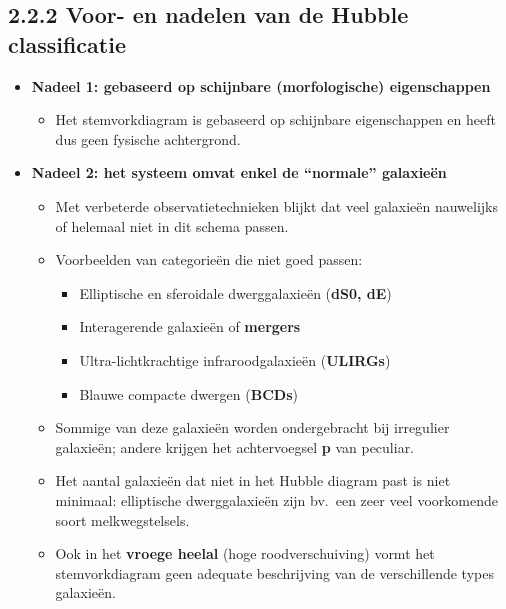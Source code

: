 \documentclass[10pt,a4paper]{article}
\begin{document}
\subsection*{2.2.2 Voor- en nadelen van de Hubble classificatie}
\begin{itemize}
  
  \item \textbf{Nadeel 1: gebaseerd op schijnbare (morfologische) eigenschappen}
  \begin{itemize}
    \item Het stemvorkdiagram is gebaseerd op schijnbare eigenschappen en heeft dus geen fysische achtergrond.
  \end{itemize}

  \item \textbf{Nadeel 2: het systeem omvat enkel de ``normale'' galaxieën}
  \begin{itemize}
    \item Met verbeterde observatietechnieken blijkt dat veel galaxieën nauwelijks of helemaal niet in dit schema passen.
    \item Voorbeelden van categorieën die niet goed passen:
    \begin{itemize}
      \item Elliptische en sferoidale dwerggalaxieën (\textbf{dS0, dE})
      \item Interagerende galaxieën of \textbf{mergers}
      \item Ultra-lichtkrachtige infraroodgalaxieën (\textbf{ULIRGs})
      \item Blauwe compacte dwergen (\textbf{BCDs})
    \end{itemize}
    \item Sommige van deze galaxieën worden ondergebracht bij irregulier galaxieën; andere krijgen het achtervoegsel \textbf{p} van peculiar.
    \item Het aantal galaxieën dat niet in het Hubble diagram past is niet minimaal: elliptische dwerggalaxieën zijn bv.\ een zeer veel voorkomende soort melkwegstelsels.
    \item Ook in het \textbf{vroege heelal} (hoge roodverschuiving) vormt het stemvorkdiagram geen adequate beschrijving van de verschillende types galaxieën.
  \end{itemize}


\end{itemize}
\end{document}
